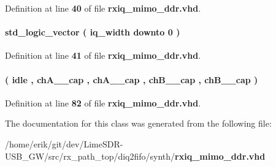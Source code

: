 Definition at line {\bf 40} of file {\bf rxiq\+\_\+mimo\+\_\+ddr.\+vhd}.

\paragraph[{reg\+\_\+l\+\_\+0}]{ {\bfseries \textcolor{comment}{std\+\_\+logic\+\_\+vector}\textcolor{vhdlchar}{ }\textcolor{vhdlchar}{(}\textcolor{vhdlchar}{ }\textcolor{vhdlchar}{ }\textcolor{vhdlchar}{ }\textcolor{vhdlchar}{ }{\bfseries {\bf iq\+\_\+width}} \textcolor{vhdlchar}{ }\textcolor{keywordflow}{downto}\textcolor{vhdlchar}{ }\textcolor{vhdlchar}{ } \textcolor{vhdldigit}{0} \textcolor{vhdlchar}{ }\textcolor{vhdlchar}{)}\textcolor{vhdlchar}{ }} \hspace{0.3cm}{\ttfamily [Signal]}}\label{classrxiq__mimo__ddr_1_1arch_af612fa4a7679a8979da2d074715ced00}


Definition at line {\bf 41} of file {\bf rxiq\+\_\+mimo\+\_\+ddr.\+vhd}.

\paragraph[{state\+\_\+type}]{ {\bfseries \textcolor{vhdlchar}{(}\textcolor{vhdlchar}{ }\textcolor{vhdlchar}{idle}\textcolor{vhdlchar}{ }\textcolor{vhdlchar}{,}\textcolor{vhdlchar}{ }\textcolor{vhdlchar}{ch\+A\+\_\+\_\+cap}\textcolor{vhdlchar}{ }\textcolor{vhdlchar}{,}\textcolor{vhdlchar}{ }\textcolor{vhdlchar}{ch\+A\+\_\+\_\+cap}\textcolor{vhdlchar}{ }\textcolor{vhdlchar}{,}\textcolor{vhdlchar}{ }\textcolor{vhdlchar}{ch\+B\+\_\+\_\+cap}\textcolor{vhdlchar}{ }\textcolor{vhdlchar}{,}\textcolor{vhdlchar}{ }\textcolor{vhdlchar}{ch\+B\+\_\+\_\+cap}\textcolor{vhdlchar}{ }\textcolor{vhdlchar}{)}\textcolor{vhdlchar}{ }} \hspace{0.3cm}{\ttfamily [Type]}}\label{classrxiq__mimo__ddr_1_1arch_aa48dc270c440aa122ccd5815799fab4c}


Definition at line {\bf 82} of file {\bf rxiq\+\_\+mimo\+\_\+ddr.\+vhd}.



The documentation for this class was generated from the following file\+:\begin{DoxyCompactItemize}
\item 
/home/erik/git/dev/\+Lime\+S\+D\+R-\/\+U\+S\+B\+\_\+\+G\+W/src/rx\+\_\+path\+\_\+top/diq2fifo/synth/{\bf rxiq\+\_\+mimo\+\_\+ddr.\+vhd}\end{DoxyCompactItemize}
